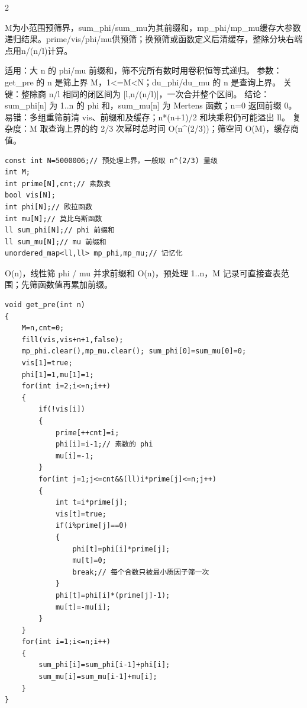 \documentclass[UTF8,fontset=fandol,a4paper,twoside]{ctexart}
\newcommand{\note}[1]{{\fontsize{10}{12}\selectfont #1\par}}
\begin{document}
\begin{multicols}{2}
\note{M为小范围预筛界，sum\_phi/\allowbreak{}sum\_mu为其前缀和，mp\_phi/\allowbreak{}mp\_mu缓存大参数递归结果。prime/\allowbreak{}vis/\allowbreak{}phi/\allowbreak{}mu供预筛；换预筛或函数定义后清缓存，整除分块右端点用n/\allowbreak{}(\allowbreak{}n/\allowbreak{}l)\allowbreak{}计算。}
\note{适用：大 n 的 phi/\allowbreak{}mu 前缀和，筛不完所有数时用卷积恒等式递归。 参数：get\_pre 的 n 是筛上界 M，1<\allowbreak{}=\allowbreak{}M<\allowbreak{}N；du\_phi/\allowbreak{}du\_mu 的 n 是查询上界。 关键：整除商 n/\allowbreak{}l 相同的闭区间为 [\allowbreak{}l,\allowbreak{}n/\allowbreak{}(\allowbreak{}n/\allowbreak{}l)\allowbreak{}]\allowbreak{}，一次合并整个区间。 结论：sum\_phi[\allowbreak{}n]\allowbreak{} 为 1.\allowbreak{}.\allowbreak{}n 的 phi 和，sum\_mu[\allowbreak{}n]\allowbreak{} 为 Mertens 函数；n=\allowbreak{}0 返回前缀 0。 易错：多组重筛前清 vis、前缀和及缓存；n*(\allowbreak{}n+\allowbreak{}1)\allowbreak{}/\allowbreak{}2 和块乘积仍可能溢出 ll。 复杂度：M 取查询上界的约 2/\allowbreak{}3 次幂时总时间 O(\allowbreak{}n\textasciicircum{}(\allowbreak{}2/\allowbreak{}3)\allowbreak{})\allowbreak{}；筛空间 O(\allowbreak{}M)\allowbreak{}，缓存商值。}
\begin{lstlisting}
const int N=5000006;// 预处理上界，一般取 n^(2/3) 量级
int M;
int prime[N],cnt;// 素数表
bool vis[N];
int phi[N];// 欧拉函数
int mu[N];// 莫比乌斯函数
ll sum_phi[N];// phi 前缀和
ll sum_mu[N];// mu 前缀和
unordered_map<ll,ll> mp_phi,mp_mu;// 记忆化
\end{lstlisting}
\note{O(\allowbreak{}n)\allowbreak{}，线性筛 phi /\allowbreak{} mu 并求前缀和 O(\allowbreak{}n)\allowbreak{}，预处理 1.\allowbreak{}.\allowbreak{}n，M 记录可直接查表范围；先筛函数值再累加前缀。}
\begin{lstlisting}
void get_pre(int n)
{
    M=n,cnt=0;
    fill(vis,vis+n+1,false);
    mp_phi.clear(),mp_mu.clear(); sum_phi[0]=sum_mu[0]=0;
    vis[1]=true;
    phi[1]=1,mu[1]=1;
    for(int i=2;i<=n;i++)
    {
        if(!vis[i])
        {
            prime[++cnt]=i;
            phi[i]=i-1;// 素数的 phi
            mu[i]=-1;
        }
        for(int j=1;j<=cnt&&(ll)i*prime[j]<=n;j++)
        {
            int t=i*prime[j];
            vis[t]=true;
            if(i%prime[j]==0)
            {
                phi[t]=phi[i]*prime[j];
                mu[t]=0;
                break;// 每个合数只被最小质因子筛一次
            }
            phi[t]=phi[i]*(prime[j]-1);
            mu[t]=-mu[i];
        }
    }
    for(int i=1;i<=n;i++)
    {
        sum_phi[i]=sum_phi[i-1]+phi[i];
        sum_mu[i]=sum_mu[i-1]+mu[i];
    }
}
\end{lstlisting}

\end{multicols}
\end{document}
